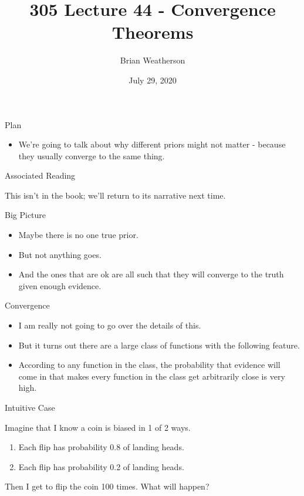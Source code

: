 \documentclass[
  ignorenonframetext,
]{beamer}
\title{305 Lecture 44 - Convergence Theorems}
\author{Brian Weatherson}
\date{July 29, 2020}
\providecommand{\tightlist}{%
  \setlength{\itemsep}{0pt}\setlength{\parskip}{0pt}}
\renewcommand{\,}{\text{, }}
\begin{document}
\frame{\titlepage}

\begin{frame}{Plan}
\protect\hypertarget{plan}{}

\begin{itemize}
\tightlist
\item
  We're going to talk about why different priors might not matter -
  because they usually converge to the same thing.
\end{itemize}

\end{frame}

\begin{frame}{Associated Reading}
\protect\hypertarget{associated-reading}{}

This isn't in the book; we'll return to its narrative next time.

\end{frame}

\begin{frame}{Big Picture}
\protect\hypertarget{big-picture}{}

\begin{itemize}
\tightlist
\item
  Maybe there is no one true prior.
\item
  But not anything goes.
\item
  And the ones that are ok are all such that they will converge to the
  truth given enough evidence.
\end{itemize}

\end{frame}

\begin{frame}{Convergence}
\protect\hypertarget{convergence}{}

\begin{itemize}
\tightlist
\item
  I am really not going to go over the details of this.
\item
  But it turns out there are a large class of functions with the
  following feature.
\item
  According to any function in the class, the probability that evidence
  will come in that makes every function in the class get arbitrarily
  close is very high.
\end{itemize}

\end{frame}

\begin{frame}{Intuitive Case}
\protect\hypertarget{intuitive-case}{}

Imagine that I know a coin is biased in 1 of 2 ways.

\begin{enumerate}
\tightlist
\item
  Each flip has probability 0.8 of landing heads.
\item
  Each flip has probability 0.2 of landing heads.
\end{enumerate}

Then I get to flip the coin 100 times. What will happen?

\end{frame}
\end{document}
